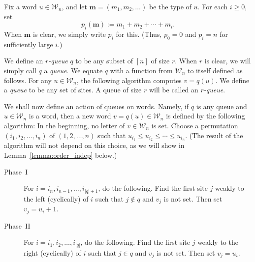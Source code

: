 \documentclass[reqno]{amsart}
\newcommand{\0}{\phantom{c}}
\newcommand{\mm}{\mathbf{m}}
\newcommand{\mcW}{\mathcal{W}}
\newenvironment{verlong}{}{}
\newenvironment{vershort}{}{}
\newcommand{\abs}[1]{\left| #1 \right|}
\newcommand{\tup}[1]{\left( #1 \right)}
\newcommand{\ive}[1]{\left[ #1 \right]}
\newcommand{\defn}[1]{{\color{darkred}\emph{#1}}} %
\theoremstyle{plain}
\theoremstyle{definition}
\numberwithin{equation}{section}
\newcommand{\travis}[1]{\todo[size=\tiny,color=blue!30]{#1 \\ \hfill --- Travis}}
\begin{document}
Fix a word $u \in \mcW_n$, and let $\mm = (m_1, m_2, \ldots)$ be the type of $u$.
For each $i \geq 0$, set
\begin{equation}
\label{eq:type_partial_sums}
p_i(\mm) := m_1 + m_2 + \cdots + m_i.
\end{equation}
When $\mm$ is clear, we simply write $p_i$ for this.
(Thus, $p_0 = 0$ and $p_i = n$ for sufficiently large $i$.)

\begin{vershort}
We define an \defn{$r$-queue} $q$ to be any subset of $\ive{n}$ of size $r$. When $r$ is clear, we will simply call $q$ a \defn{queue}.
We equate $q$ with a function from $\mcW_n$ to itself defined as follows.
For any $u \in \mcW_n$, the following algorithm computes $v = q(u)$.
\end{vershort}
\begin{verlong}
We define a \defn{queue} to be any set of sites.
A queue of size $r$ will be called an \defn{$r$-queue}.

We shall now define an action of queues on words.
Namely, if $q$ is any queue and $u \in \mcW_n$ is a word,
then a new word $v = q(u) \in \mcW_n$ is defined by the following algorithm:
\end{verlong}
In the beginning, no letter of $v \in \mcW_n$ is set.
Choose a permutation $\tup{i_1, i_2, \ldots, i_n}$ of $\tup{1, 2, \ldots, n}$
such that $u_{i_1} \leq u_{i_2} \leq \cdots \leq u_{i_n}$.
\begin{verlong}
(The result of the algorithm will not depend on this choice,
as we will show in Lemma~\ref{lemma:order_indep} below.)
\end{verlong}

\begin{description}
\item[Phase~I]
  For $i = i_n, i_{n-1}, \ldots, i_{\abs{q}+1}$, do the following.
    Find the first site $j$ weakly to the left (cyclically) of $i$ such that $j \notin q$ and $v_j$ is not set.
    Then set $v_j = u_i + 1$.

\item[Phase~II]
  For $i = i_1, i_2, \ldots, i_{\abs{q}}$, do the following.
    Find the first site $j$ weakly to the right (cyclically) of $i$ such that $j \in q$ and $v_j$ is not set.
    Then set $v_j = u_i$.
\end{description}
\end{document}
